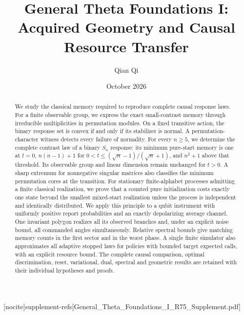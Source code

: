 
[nocite]{supplement-refs}[General_Theta_Foundations_I_R75_Supplement.pdf]
\title[Acquired geometry and causal resource transfer]{General Theta Foundations I:\\Acquired Geometry and Causal Resource Transfer}
\author{Qian Qi}\date{October 2026}

\begin{abstract}
We study the classical memory required to reproduce complete causal
response laws. For a finite observable group, we express the exact
small-contrast memory through irreducible multiplicities in permutation
modules. On a fixed transitive action, the binary response set is
convex if and only if its stabilizer is normal. A permutation-character
witness detects every failure of normality. For every $n\ge5$, we determine
the complete contrast law of a binary $S_n$ response: its minimum
pure-start memory is one at $t=0$, $n(n-1)+1$ for
$0<t\le(\sqrt n-1)/(\sqrt n+1)$, and $n^2+1$ above that threshold.
Its observable group and linear dimension remain unchanged for $t>0$. A sharp extremum
for nonnegative singular matrices also classifies the minimum permutation
cores at the transition. For stationary finite-alphabet processes admitting
a finite classical realization, we prove that a counted pure initialization
costs exactly one state beyond the smallest mixed-start realization unless
the process is independent and identically distributed.
We apply this principle to a qubit instrument with uniformly positive
report probabilities and an exactly depolarizing average channel.
One invariant polygon realizes all
its observed branches and, under an explicit noise bound, all commanded
angles simultaneously. Relative spectral bounds give matching memory
counts in the first sector and in the worst phase. A single finite
simulator also approximates all adaptive stopped laws for policies with
bounded target expected calls, with an explicit resource bound. The complete
causal comparison, optimal discrimination, reset, variational, dual,
spectral and geometric results are retained with their individual
hypotheses and proofs.
\end{abstract}
\maketitle












